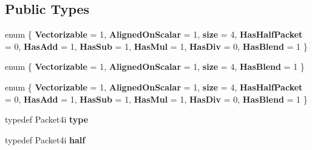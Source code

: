 \subsection*{Public Types}
\begin{DoxyCompactItemize}
\item 
\mbox{\label{struct_eigen_1_1internal_1_1packet__traits_3_01int_01_4_a89b788194ab8e9a9bd16221f68171f9b}} 
enum \{ \newline
{\bfseries Vectorizable} = 1, 
{\bfseries Aligned\+On\+Scalar} = 1, 
{\bfseries size} = 4, 
{\bfseries Has\+Half\+Packet} = 0, 
\newline
{\bfseries Has\+Add} = 1, 
{\bfseries Has\+Sub} = 1, 
{\bfseries Has\+Mul} = 1, 
{\bfseries Has\+Div} = 0, 
\newline
{\bfseries Has\+Blend} = 1
 \}
\item 
\mbox{\label{struct_eigen_1_1internal_1_1packet__traits_3_01int_01_4_a03aa223f70bd00e51fb32857c51f10e3}} 
enum \{ {\bfseries Vectorizable} = 1, 
{\bfseries Aligned\+On\+Scalar} = 1, 
{\bfseries size} = 4, 
{\bfseries Has\+Blend} = 1
 \}
\item 
\mbox{\label{struct_eigen_1_1internal_1_1packet__traits_3_01int_01_4_a6cbaaa9975bfdc89a4678411dcdaecd4}} 
enum \{ \newline
{\bfseries Vectorizable} = 1, 
{\bfseries Aligned\+On\+Scalar} = 1, 
{\bfseries size} = 4, 
{\bfseries Has\+Half\+Packet} = 0, 
\newline
{\bfseries Has\+Add} = 1, 
{\bfseries Has\+Sub} = 1, 
{\bfseries Has\+Mul} = 1, 
{\bfseries Has\+Div} = 0, 
\newline
{\bfseries Has\+Blend} = 1
 \}
\item 
\mbox{\label{struct_eigen_1_1internal_1_1packet__traits_3_01int_01_4_a4c035d9ce275515f3eabf2934623190b}} 
typedef Packet4i {\bfseries type}
\item 
\mbox{\label{struct_eigen_1_1internal_1_1packet__traits_3_01int_01_4_abcd1d398b42e5452213afe6652f7cebb}} 
typedef Packet4i {\bfseries half}
\item 

\end{DoxyCompactItemize}
